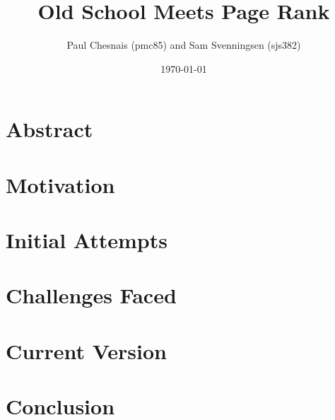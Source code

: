\documentclass{article}
\title{Old School \tetris{} Meets Page Rank}
\author{Paul Chesnais (pmc85) and Sam Svenningsen (sjs382)}
\date{\today}
\begin{document}
\maketitle
\thispagestyle{empty}

\section{Abstract}
\label{sec:abstract}

\section{Motivation}
\label{sec:motivation}

\section{Initial Attempts}
\label{sec:initial_attempts}

\section{Challenges Faced}
\label{sec:challenges_faced}

\section{Current Version}
\label{sec:current_version}

\section{Conclusion}
\label{sec:conclusion}
\end{document}
